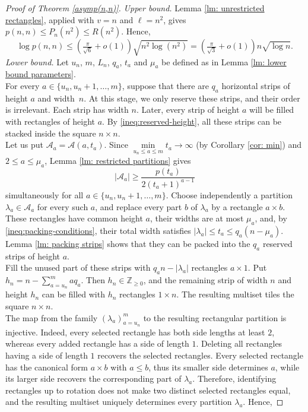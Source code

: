 \documentclass[12pt,a4paper]{amsart}
\numberwithin{equation}{section}
\theoremstyle{plain}
\theoremstyle{definition}
\theoremstyle{remark}
\begin{document}
\begin{proof}[Proof of Theorem \ref{asymp(n,n)}]
\emph{Upper bound.}
Lemma \ref{lm: unrestricted rectangles}, applied with $v=n$ and $\ell=n^2$, gives $p(n,n)\le  P_n(n^2)\le  R(n^2)$. Hence,
$$
\log p(n,n)
\le 
\left(\tfrac{\pi}{\sqrt6}+o(1)\right)\sqrt{n^2\log(n^2)}
=
\left(\tfrac{\pi}{\sqrt3}+o(1)\right)n\sqrt{\log n}.
$$
\emph{Lower bound.}
Let $u_n$, $m$, $L_n$, $q_a$, $t_a$ and $\mu_a$ be defined as in Lemma \ref{lm: lower bound parameters}.\\ For every $a\in\{u_n,u_{n}+1,\ldots,m\}$, suppose that there are $q_a$ horizontal strips of height $a$ and width~$n$. 
At this stage, we only reserve these strips, and their order is irrelevant. Each strip has width $n$. Later, every strip of height $a$ will be filled with rectangles of height $a$.
By \eqref{ineq:reserved-height}, all these strips can be stacked inside the square $n\times n$.\\
Let us put $\mathcal A_a=\mathcal A(a,t_a)$. Since $\min\limits_{u_n\le  a\le  m}t_a\to\infty$ (by Corollary \ref{cor: min}) and $2\le  a\le  \mu_a$, Lemma \ref{lm: restricted partitions} gives
$$
|\mathcal A_a|
\geq
\frac{p(t_a)}{2(t_a+1)^{a-1}}
$$
simultaneously for all $a\in\{u_n,u_n+1,\ldots,m\}$. Choose independently a partition $\lambda_a\in\mathcal A_a$ for every such $a$, and replace every part $b$ of $\lambda_a$ by a rectangle $a\times b$. 
These rectangles have common height $a$, their widths are at most $\mu_a$, and, by \eqref{ineq:packing-conditions}, their total width satisfies $|\lambda_a|\le  t_a\le  q_a(n-\mu_a)$. Lemma \ref{lm: packing strips} shows that they can be packed into the $q_a$ reserved strips of height $a$.\\
Fill the unused part of these strips with $q_an-|\lambda_a|$ rectangles $a\times1$. Put $h_n=n-\sum_{a=u_n}^{m}a q_a$. Then $h_n\in\mathbb Z_{\geq0}$, and the remaining strip of width $n$ and height $h_n$ can be filled with $h_n$ rectangles $1\times n$. The resulting multiset tiles the square $n\times n$.\\
The map from the family $(\lambda_a)_{a=u_n}^{m}$ to the resulting rectangular partition is injective. Indeed, every selected rectangle has both side lengths at least $2$, whereas every added rectangle has a side of length $1$. Deleting all rectangles having a side of length $1$ recovers the selected rectangles. Every selected rectangle has the canonical form $a\times b$ with $a\le b$, thus its smaller side determines $a$, while its larger side recovers the corresponding part of $\lambda_a$. Therefore, identifying rectangles up to rotation does not make two distinct selected rectangles equal, and the resulting multiset uniquely determines every partition $\lambda_a$. Hence,

\end{proof}
\end{document}
